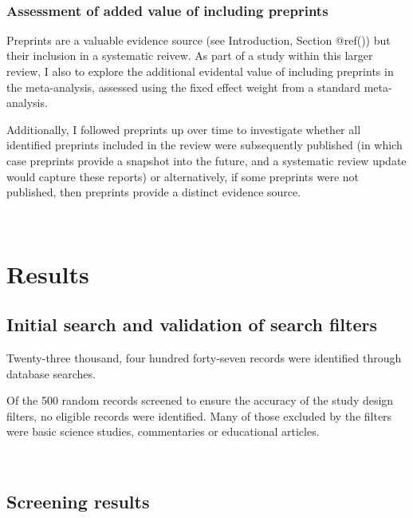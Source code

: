 \documentclass[a4paper, twoside]{templates/ociamthesis}
\begin{document}
~

\hypertarget{assessment-of-added-value-of-including-preprints}{%
\subsubsection{Assessment of added value of including preprints}\label{assessment-of-added-value-of-including-preprints}}

Preprints are a valuable evidence source (see Introduction, Section @ref()) but their inclusion in a systematic reivew. As part of a study within this larger review, I also to explore the additional evidental value of including preprints in the meta-analysis, assessed using the fixed effect weight from a standard meta-analysis.

Additionally, I followed preprints up over time to investigate whether all identified preprints included in the review were subsequently published (in which case preprints provide a snapshot into the future, and a systematic review update would capture these reports) or alternatively, if some preprints were not published, then preprints provide a distinct evidence source.

~

\hypertarget{results}{%
\section{Results}\label{results}}

\hypertarget{initial-search-and-validation-of-search-filters}{%
\subsection{Initial search and validation of search filters}\label{initial-search-and-validation-of-search-filters}}

Twenty-three thousand, four hundred forty-seven records were identified through database searches.

Of the 500 random records screened to ensure the accuracy of the study design filters, no eligible records were identified. Many of those excluded by the filters were basic science studies, commentaries or educational articles.

~

\hypertarget{screening-results}{%
\subsection{Screening results}\label{screening-results}}
\end{document}
